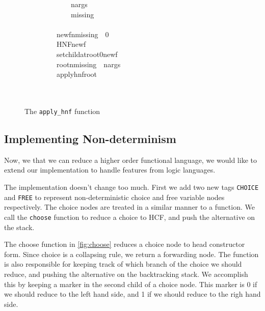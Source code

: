\documentclass{book}
\theoremstyle{definition}
\begin{document}
\begin{figure}
\begin{tabbing}
\ttfamily ~~~~~~~~~~~~~nargs\\
\ttfamily ~~~~~~~~~~~~~missing\\
\ttfamily ~~~~~~~~~\\
\ttfamily ~~~~~~~~~newfnmissing~~0\\
\ttfamily ~~~~~~~~~HNFnewf\\
\ttfamily ~~~~~~~~~setchildatroot0newf\\
\ttfamily ~~~~~~~~~rootnmissing~~nargs\\
\ttfamily ~~~~~~~~~applyhnfroot\\
\ttfamily ~~~~~\\
\ttfamily ~
\end{tabbing}
\caption{The \texttt{apply\_hnf}  function}
\label{fig:apply}
\end{figure}


\subsection{Implementing Non-determinism} \label{Implementing Non-determinism}

Now, we that we can reduce a higher order functional language,
we would like to extend our implementation to handle features from logic languages.

The implementation doesn't change too much.
First we add two new tags \texttt{CHOICE} and \texttt{FREE}
to represent non-deterministic choice and free variable nodes respectively.
The choice nodes are treated in a similar manner to a function.
We call the \texttt{choose} function to reduce a choice to HCF,
and push the alternative on the stack.

The choose function in \ref{fig:choose} reduces a choice node to head constructor form.
Since choice is a collapsing rule, we return a forwarding node.
The function is also responsible for keeping track of which branch of the choice we should reduce,
and pushing the alternative on the backtracking stack.
We accomplish this by keeping a marker in the second child of a choice node.
This marker is 0 if we should reduce to the left hand side, and 1 if we should reduce to the righ
hand side.
\end{document}

